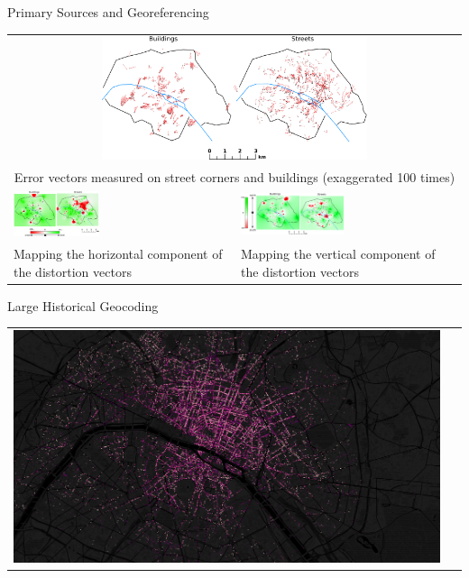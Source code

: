 \documentclass[final,hyperref={pdfpagelabels=false}]{beamer}
\begin{document}
\begin{frame}
\begin{columns}
\begin{column}{0.494\textwidth}
\begin{block}{Primary Sources and Georeferencing}
\begin{tabular}{p{}p{}}
        \multicolumn{2}{c}{\includegraphics[width=0.6\textwidth]{figures/errorthemes.png}}\\
	\multicolumn{2}{c}{\scriptsize Error vectors measured on street corners and buildings (exaggerated 100 times)}\\
        \vspace{0pt}
        \includegraphics[width=0.4\textwidth]{figures/error_x.png}&
        \vspace{0pt}
        \hspace*{-1em}\includegraphics[width=0.48\textwidth]{figures/error_y.png}\\
	\scriptsize Mapping the horizontal component of the distortion vectors&
        \scriptsize Mapping the vertical component of the distortion vectors
      \end{tabular}
    \end{block}
    \begin{block}{Large Historical Geocoding}
      \centering
      \begin{tabular}{>{\centering}m{}}
        \includegraphics[width=0.965\textwidth,trim={0 6cm 0 2cm},clip]{figures/geocoding}\\

\end{tabular}
\end{block}
\end{column}
\end{columns}
\end{frame}
\end{document}
